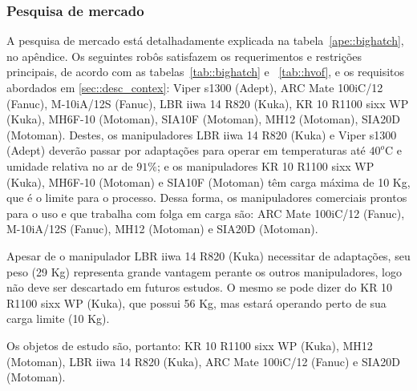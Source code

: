 \subsubsection{Pesquisa de mercado}
A pesquisa de mercado está detalhadamente explicada na
tabela~\ref{ape::bighatch}, no apêndice. Os seguintes robôs satisfazem os
requerimentos e restrições principais, de acordo com as tabelas~\ref{tab::bighatch} e ~\ref{tab::hvof}, e os requisitos abordados
em \ref{sec::desc_contex}: Viper s1300 (Adept), ARC Mate 100iC/12 (Fanuc),
M-10iA/12S (Fanuc), LBR iiwa 14 R820 (Kuka), KR 10 R1100 sixx WP (Kuka), MH6F-10
(Motoman), SIA10F (Motoman), MH12 (Motoman), SIA20D (Motoman). Destes, os
manipuladores LBR iiwa 14 R820 (Kuka) e Viper s1300 (Adept) deverão passar por adaptações para
operar em temperaturas até $40^o$C e umidade relativa no ar de $91\%$; e os
manipuladores KR 10 R1100 sixx WP (Kuka), MH6F-10
(Motoman) e SIA10F (Motoman) têm carga máxima de 10 Kg, que é o limite para o
processo. Dessa forma, os manipuladores comerciais prontos para o uso e que
trabalha com folga em carga são: ARC Mate 100iC/12 (Fanuc), M-10iA/12S (Fanuc),
MH12 (Motoman) e SIA20D (Motoman).

Apesar de o manipulador LBR iiwa 14 R820 (Kuka) necessitar de adaptações, seu
peso (29 Kg) representa grande vantagem perante os outros manipuladores, logo
não deve ser descartado em futuros estudos. O mesmo se pode dizer do KR 10 R1100
sixx WP (Kuka), que possui 56 Kg, mas estará operando perto de sua carga limite
(10 Kg).

Os objetos de estudo são, portanto: KR 10 R1100
sixx WP (Kuka), MH12 (Motoman), LBR iiwa 14 R820 (Kuka), ARC Mate 100iC/12
(Fanuc) e SIA20D (Motoman).


